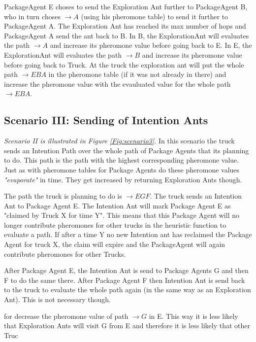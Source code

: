 \npar PackageAgent E choses to send the Exploration Ant further to PackageAgent B, who in turn choses \textit{$\rightarrow A$} (using his pheromone table) to send it further to PackageAgent A. The Exploration Ant has reached its max number of hops and PackageAgent A send the ant back to B. In B, the ExplorationAnt will evaluates the path \textit{$\rightarrow A$} and increase its pheromone value before going back to E. In E, the ExplorationAnt will evaluates the path \textit{$\rightarrow B$} and increase its pheromone value before going back to Truck. At the truck the exploration ant will put the whole path \textit{$\rightarrow EBA$} in the pheromone table (if it was not already in there) and increase the pheromone value with the evauluated value for the whole path \textit{$\rightarrow EBA$}. 

\subsection*{Scenario III: Sending of Intention Ants}
\label{subsec:scenario3}
\npar \textit{Scenario II is illustrated in Figure \ref{Fig:scenario3}.}
\npar In this scenario the truck sends an Intention Path over the whole path of Package Agents that its planning to do. This path is the path with the highest corresponding pheromone value. Just as with pheromone tables for Package Agents do these pheromone values \textit{"evaporate"} in time. They get increased by returning Exploration Ants though.

\npar The path the truck is planning to do is \textit{$\rightarrow EGF$}. The truck sends an Intention Ant to Package Agent E. The Intention Ant will mark Package Agent E as "claimed by Truck X for time Y". This means that this Package Agent will no longer contribute pheromones for other trucks in the heuristic function to evaluate a path. If after a time Y no new Intention ant has reclaimed the Package Agent for truck X, the claim will expire and the PackageAgent will again contribute pheromones for other Trucks.

\npar After Package Agent E, the Intention Ant is send to Package Agents G and then F to do the same there. After Package Agent F then Intention Ant is send back to the truck to evaluate the whole path again (in the same way as an Exploration Ant). This is not necessary though.





 for  decrease the pheromone value of path \textit{$\rightarrow G$} in E. This way it is less likely that Exploration Ants will visit G from E and therefore it is less likely that other Truc

